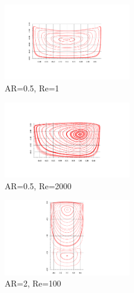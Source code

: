 \documentclass[twocolumn,10pt]{asme2ej}
\begin{document}
\begin{figure}[tbh]
\begin{center}
\includegraphics[width=0.5\textwidth]{figure/AR0.5-Re1 streamFunction axis final.pdf}
\caption{AR=0.5, Re=1}
\label{}
\end{center}
\end{figure}

\begin{figure}[tbh]
\begin{center}
\includegraphics[width=0.5\textwidth]{figure/AR0.5-Re2000 streamFunction axis final.pdf}
\caption{AR=0.5, Re=2000}
\label{}
\end{center}
\end{figure}

\begin{figure}[tbh]
\begin{center}
\includegraphics[width=0.5\textwidth]{figure/AR2-Re100 streamFunction axis final.pdf}
\caption{AR=2, Re=100}
\label{}
\end{center}
\end{figure}
\end{document}
